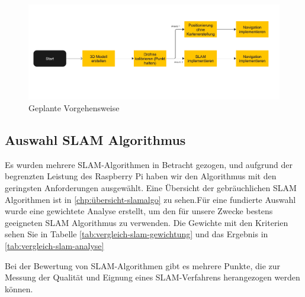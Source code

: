 \begin{figure}
    \includegraphics[scale=0.7]{images/ansatz_plan.pdf}
    \caption{Geplante Vorgehensweise}\label{fig:vorgehensweise}
\end{figure}

\subsection{Auswahl SLAM Algorithmus}

Es wurden mehrere \ac{SLAM}-Algorithmen in Betracht gezogen, und aufgrund der begrenzten Leistung des Raspberry Pi haben wir den Algorithmus mit den geringsten Anforderungen ausgewählt. Eine Übersicht der gebräuchlichen \ac{SLAM} Algorithmen ist in \ref{chp:übersicht-slamalgo} zu sehen.Für eine fundierte Auswahl wurde eine gewichtete Analyse erstellt, um den für unsere Zwecke bestens geeigneten \ac{SLAM} Algorithmus zu verwenden. Die Gewichte mit den Kriterien sehen Sie in Tabelle \ref{tab:vergleich-slam-gewichtung} und das Ergebnis in \ref{tab:vergleich-slam-analyse}

Bei der Bewertung von \ac{SLAM}-Algorithmen gibt es mehrere Punkte, die zur Messung der Qualität und Eignung eines SLAM-Verfahrens herangezogen werden können.


